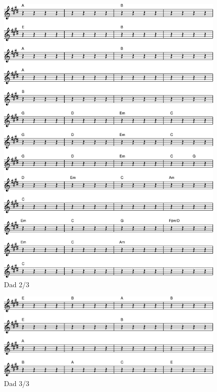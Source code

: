 \begin{figure}[!htbp]
  \includegraphics[width=\textwidth,height=\textheight,keepaspectratio]{../songs/xx_dad-1.png}
  \caption{Dad 2/3}
  \label{fig:xx_dad_2}
\end{figure}

\begin{figure}[!htbp]
  \includegraphics[width=\textwidth,height=\textheight,keepaspectratio]{../songs/xx_dad-2.png}
  \caption{Dad 3/3}
  \label{fig:xx_dad_3}
\end{figure}
